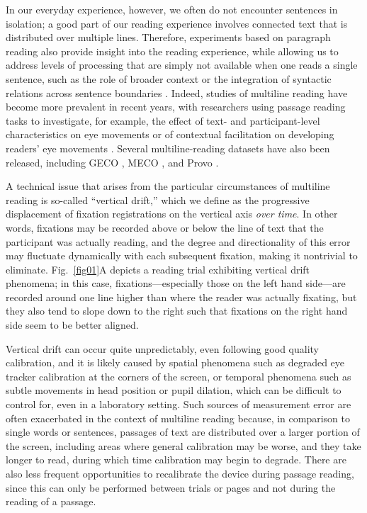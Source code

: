 \documentclass[doc,biblatex]{apa7}
\begin{document}
In our everyday experience, however, we often do not encounter sentences in isolation; a good part of our reading experience involves connected text that is distributed over multiple lines. Therefore, experiments based on paragraph reading also provide insight into the reading experience, while allowing us to address levels of processing that are simply not available when one reads a single sentence, such as the role of broader context or the integration of syntactic relations across sentence boundaries \parencite{Jarodzka:2017}. Indeed, studies of multiline reading have become more prevalent in recent years, with researchers using passage reading tasks to investigate, for example, the effect of text- and participant-level characteristics on eye movements \parencite{Kuperman:2018} or of contextual facilitation on developing readers' eye movements \parencite{TiffinRichards:2020}. Several multiline-reading datasets have also been released, including GECO \parencite{Cop:2017}, MECO \parencite{Kuperman:0000}, and Provo \parencite{Luke:2018}.

A technical issue that arises from the particular circumstances of multiline reading is so-called ``vertical drift,'' which we define as the progressive displacement of fixation registrations on the vertical axis \textit{over time}. In other words, fixations may be recorded above or below the line of text that the participant was actually reading, and the degree and directionality of this error may fluctuate dynamically with each subsequent fixation, making it nontrivial to eliminate. Fig.~\ref{fig01}A depicts a reading trial exhibiting vertical drift phenomena; in this case, fixations---especially those on the left hand side---are recorded around one line higher than where the reader was actually fixating, but they also tend to slope down to the right such that fixations on the right hand side seem to be better aligned.

Vertical drift can occur quite unpredictably, even following good quality calibration, and it is likely caused by spatial phenomena such as degraded eye tracker calibration at the corners of the screen, or temporal phenomena such as subtle movements in head position or pupil dilation, which can be difficult to control for, even in a laboratory setting. Such sources of measurement error are often exacerbated in the context of multiline reading because, in comparison to single words or sentences, passages of text are distributed over a larger portion of the screen, including areas where general calibration may be worse, and they take longer to read, during which time calibration may begin to degrade. There are also less frequent opportunities to recalibrate the device during passage reading, since this can only be performed between trials or pages and not during the reading of a passage.
\end{document}
